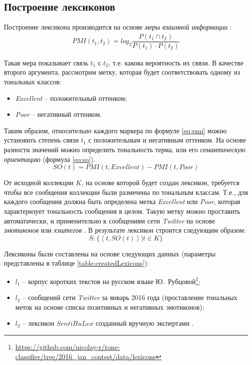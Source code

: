 \subsection{Построение лексиконов}

Построение лексикона производится на основе {\it меры взаимной информации}
\cite{lexiconSO}:
\begin{gather}
    PMI(t_1, t_2) = log_2 \dfrac{P(t_1\cap t_2)}{P(t_1)\cdot P(t_2)}
    \label{eq:pmi}
\end{gather}

Такая мера показывает связь $t_1$ с $t_2$, т.е. какова вероятность их связи.
В качестве второго аргумента, рассмотрим метку, которая будет соответствовать
одному из тональных классов:
\begin{itemize}
    \item {\it Excellent} -- положительный оттенком;
    \item {\it Poor} -- негативный оттенком.
\end{itemize}

Таким образом, относительно каждого маркера по формуле \ref{eq:pmi} можно
установить степень связи $t_1$ с положительным и негативным оттенком.
На основе разности значений можно определить тональность терма, или его
{\it семантическую ориентацию} (формула \ref{eq:so}).
\begin{equation}
    \label{eq:so}
    SO(t) = PMI(t, Excellent) - PMI(t, Poor)
\end{equation}

От исходной коллекции $K$, на основе которой будет создан лексикон, требуется
чтобы все сообщения коллекции были размечены по тональным классам.
Т.е., для каждого сообщения должна быть определена метка {\it Excellent} или
{\it Poor}, которая характеризует тональность сообщения в целом.
Такую метку можно проставить автоматически, и применительно к сообщениям
сети {\it Twitter} на основе {\it эмотиконов} или {\it хэштегов} \cite{severyn}.
В результате лексикон строится следующим образом:
\begin{equation}
    S : \{ \left< t, SO(t) \right> | t \in K\}
\end{equation}


Лексиконы были составлены на основе следующих данных (параметры представлены
в таблице \ref{table:createdLexicons}):

\begin{itemize}
    \item $l_1$ -- корпус коротких текстов на русском языке Ю.~Рубцовой\footnote{
        \url{https://github.com/nicolay-r/tone-classifier/tree/2016_jan_contest/data/lexicons}
    };
    \item $l_2$ -- сообщений сети {\it Twitter} за январь 2016 года
        (проставление тональных меток на основе списка позитивных и негативных
        эмотиконов);
    \item $l_3$ -- лексикон $SentiRuLex$ созданный вручную экспертами
        \cite{expertLexicon}.
\end{itemize}


